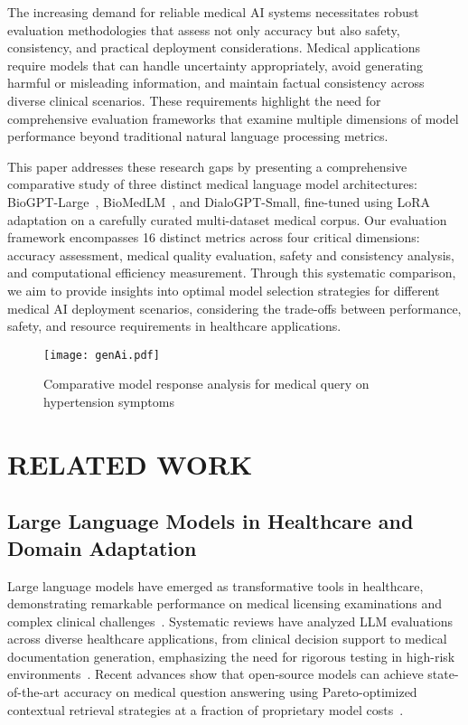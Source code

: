 \documentclass[conference]{IEEEtran}
\begin{document}
The increasing demand for reliable medical AI systems necessitates robust evaluation methodologies that assess not only accuracy but also safety, consistency, and practical deployment considerations. Medical applications require models that can handle uncertainty appropriately, avoid generating harmful or misleading information, and maintain factual consistency across diverse clinical scenarios. These requirements highlight the need for comprehensive evaluation frameworks that examine multiple dimensions of model performance beyond traditional natural language processing metrics.

This paper addresses these research gaps by presenting a comprehensive comparative study of three distinct medical language model architectures: BioGPT-Large~\cite{li2022biogpt}, BioMedLM~\cite{zhang2024biomedlm}, and DialoGPT-Small, fine-tuned using LoRA adaptation on a carefully curated multi-dataset medical corpus. Our evaluation framework encompasses 16 distinct metrics across four critical dimensions: accuracy assessment, medical quality evaluation, safety and consistency analysis, and computational efficiency measurement. Through this systematic comparison, we aim to provide insights into optimal model selection strategies for different medical AI deployment scenarios, considering the trade-offs between performance, safety, and resource requirements in healthcare applications.

\begin{figure*}[!t]
\centering
\texttt{[image: genAi.pdf]}
\caption{Comparative model response analysis for medical query on hypertension symptoms}
\label{fig:model_responses}
\end{figure*}

\section{RELATED WORK}

\subsection{Large Language Models in Healthcare and Domain Adaptation}

Large language models have emerged as transformative tools in healthcare, demonstrating remarkable performance on medical licensing examinations and complex clinical challenges~\cite{thirunavukarasu2023large,nori2023capabilities}. Systematic reviews have analyzed LLM evaluations across diverse healthcare applications, from clinical decision support to medical documentation generation, emphasizing the need for rigorous testing in high-risk environments~\cite{bedi2024systematic}. Recent advances show that open-source models can achieve state-of-the-art accuracy on medical question answering using Pareto-optimized contextual retrieval strategies at a fraction of proprietary model costs~\cite{bayarri2025pareto}.
\end{document}
